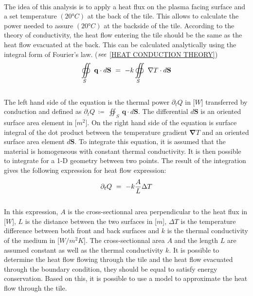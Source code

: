\\
\break
\normalsize{\indent The idea of this analysis is to apply a heat flux on the plasma facing surface and a set temperature $(20 \si{\degree} C)$ at the back of the tile. This allows to calculate the power needed to assure $(20 \si{\degree} C)$ at the backside of the tile. According to the theory of conductivity, the heat flow entering the tile should be the same as the heat flow evacuated at the back. This can be calculated analytically using the integral form of Fourier's law. ($\it{see}$ \ref{HEAT CONDUCTION THEORY})}
\begin{equation}
    \oiint\displaylimits_{S} \ \mathbf{q} \cdot d \mathbf{S} \ = \ -k\oiint\displaylimits_{S} \ \mathbf{\nabla} T \cdot d \mathbf{S}
    \tagaddtext{[\si{\watt}]}
    \label{eqn:IntFormofFourier}
\end{equation}
\\
\break
\normalsize{\indent The left hand side of the equation  is the thermal power $\partial_t Q$ in [$W$] transferred by conduction and defined as $\partial_t Q \ \coloneqq \ \oiint_{S} \ \mathbf{q} \cdot d \mathbf{S}$. The differential $d \mathbf{S}$ is an oriented surface area element in [$m^2$]. On the right hand side of the equation is surface integral of the dot product between the temperature gradient $\mathbf{\nabla} T$ and an oriented surface area element $d \mathbf{S}$. To integrate this equation, it is assumed that the material is homogeneous with constant thermal conductivity. It is then possible to integrate  for a 1-D geometry between two points. The result of the integration gives the following expression for heat flow expression:}
\begin{equation}
    \partial_t Q \ = \ -k \frac{A}{L} \Delta T
    \tagaddtext{[\si{\watt}]}
    \label{eqn:HeatFlow}
\end{equation}
\\
\break
\normalsize{\indent In this expression, $A$ is the cross-sectionnal area perpendicular to the heat flux in [$W$], $L$ is the distance between the two surfaces in [$m$], $\Delta T$ is the temperature difference between both front and back surfaces and $k$ is the thermal conductivity of the medium in [$W/m^2K$]. The cross-sectionnal area $A$ and the length $L$ are assumed constant as well as the thermal conductivity $k$. It is possible to determine the heat flow flowing through the tile and the heat flow evacuated through the boundary condition, they should be equal to satisfy energy conservation. Based on this, it is possible to use a model to approximate the heat flow through the tile.}
